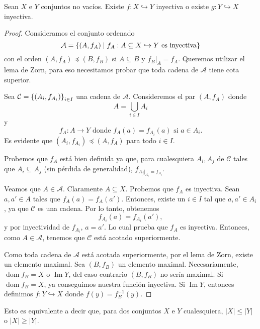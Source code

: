 \begin{theorem}
    Sean $X$ e $Y$ conjuntos no vacíos. Existe $f: X \hookrightarrow Y$ inyectiva o existe $g: Y \hookrightarrow X$ inyectiva.
\end{theorem}

\begin{proof}
    Consideramos el conjunto ordenado
    $$
        \mathcal{A} = \left\{  (A, f_{A}) \mid f_{A}: A \subseteq X \hookrightarrow Y  \text{ es inyectiva} \right\}
    $$
    con el orden $(A, f_{A}) \preceq (B, f_{B})$ si $A \subseteq B$ y $f_{B}|_{A} = f_{A}$. Queremos utilizar el lema de Zorn, para eso necesitamos probar que toda cadena de $\mathcal{A}$ tiene cota superior. 

    Sea $\mathcal{C} = \left\{  (A_{i}, f_{A_{i}}) \right\}_{i \in I}$ una cadena de $\mathcal{A}$. Consideremos el par $(A, f_{A})$ donde
    $$
        A = \bigcup_{i \in I} A_{i}
    $$
    y
    $$
        f_{A} : A \to Y \text{ donde } f_{A}(a) = f_{A_{i}}(a) \text{ si } a \in A_{i}.
    $$
    Es evidente que $(A_{i}, f_{A_{i}}) \preceq (A, f_{A})$ para todo $i \in I$.

    Probemos que $f_{A}$ está bien definida ya que, para cualesquiera $A_{i}, A_{j}$ de $\mathcal{C}$ tales que $A_{i} \subseteq A_{j}$ (sin pérdida de generalidad), $f_{A_{j}|_{A_{i}} = f_{A_{i}}}$. 

    Veamos que $A \in \mathcal{A}$. Claramente $A \subseteq X$. Probemos que $f_{A}$ es inyectiva. Sean $a, a' \in A$ tales que $f_{A}(a) = f_{A}(a')$. Entonces, existe un $i \in I$ tal que $a, a' \in A_{i}$, ya que $\mathcal{C}$ es una cadena. Por lo tanto, obtenemos
    $$
        f_{A_{i}}(a) =f_{A_{i}}(a'),
    $$
    y por inyectividad de $f_{A_{i}}$, $a = a'$. Lo cual prueba que $f_{A}$ es inyectiva. Entonces, como $A \in \mathcal{A}$, tenemos que $\mathcal{C}$ está acotado superiormente.

    Como toda cadena de $\mathcal{A}$ está acotada superiormente, por el lema de Zorn, existe un elemento maximal. Sea $(B, f_{B})$ un elemento maximal. Necesariamente, $\operatorname{dom} f_{B} = X$ o 
    $\operatorname{Im} Y$, del caso contrario $(B, f_{B})$ no sería maximal. Si $\operatorname{dom} f_{B} = X$, ya conseguimos nuestra función inyectiva. Si $\operatorname{Im} Y$, entonces definimos $f: Y \hookrightarrow X$ donde $f(y) = f_{B}^{-1}(y)$.
\end{proof}

\begin{remark}
    Esto es equivalente a decir que, para dos conjuntos $X$ e $Y$ cualesquiera, $\lvert X \rvert \leq \lvert Y \rvert$ o $\lvert X \rvert \geq \lvert Y \rvert$.
\end{remark}

